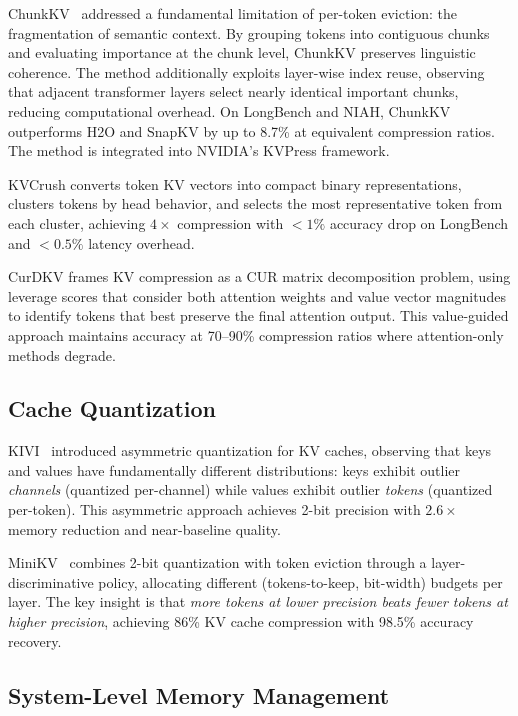 \documentclass[conference]{IEEEtran}
\begin{document}
ChunkKV~\cite{chunkkv} addressed a fundamental limitation of per-token eviction: the fragmentation of semantic context. By grouping tokens into contiguous chunks and evaluating importance at the chunk level, ChunkKV preserves linguistic coherence. The method additionally exploits layer-wise index reuse, observing that adjacent transformer layers select nearly identical important chunks, reducing computational overhead. On LongBench and NIAH, ChunkKV outperforms H2O and SnapKV by up to 8.7\% at equivalent compression ratios. The method is integrated into NVIDIA's KVPress framework.

KVCrush converts token KV vectors into compact binary representations, clusters tokens by head behavior, and selects the most representative token from each cluster, achieving $4\times$ compression with $<1\%$ accuracy drop on LongBench and $<0.5\%$ latency overhead.

CurDKV frames KV compression as a CUR matrix decomposition problem, using leverage scores that consider both attention weights and value vector magnitudes to identify tokens that best preserve the final attention output. This value-guided approach maintains accuracy at 70--90\% compression ratios where attention-only methods degrade.

\subsection{Cache Quantization}

KIVI~\cite{kivi} introduced asymmetric quantization for KV caches, observing that keys and values have fundamentally different distributions: keys exhibit outlier \textit{channels} (quantized per-channel) while values exhibit outlier \textit{tokens} (quantized per-token). This asymmetric approach achieves 2-bit precision with $2.6\times$ memory reduction and near-baseline quality.

MiniKV~\cite{minikv} combines 2-bit quantization with token eviction through a layer-discriminative policy, allocating different (tokens-to-keep, bit-width) budgets per layer. The key insight is that \textit{more tokens at lower precision beats fewer tokens at higher precision}, achieving 86\% KV cache compression with 98.5\% accuracy recovery.

\subsection{System-Level Memory Management}
\end{document}
